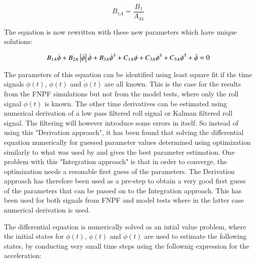             
    
    \begin{equation}
B_{1A} = \frac{B_{1}}{A_{44}}
\label{eq:equation}
\end{equation}

    

    The equation is now rewritten with these new parameters which have
unique solutions:
 
            
    
    \begin{equation}
B_{1A} \dot{\phi} \\ + B_{2A} \left|{\dot{\phi}}\right| \dot{\phi} \\ + B_{3A} \dot{\phi}^{3} \\ + C_{1A} \phi \\ + C_{3A} \phi^{3} \\ + C_{5A} \phi^{5} \\ + \ddot{\phi} = 0
\label{eq:equation}
\end{equation}

    

    The parameters of this equation can be identified using least square fit
if the time signals \(\phi(t)\), \(\dot{\phi}(t)\) and
\(\ddot{\phi}(t)\) are all known. This is the case for the results from
the FNPF simulations but not from the model tests, where only the roll
signal \(\phi(t)\) is known. The other time derivatives can be estimated
using numerical derivation of a low pass filtered roll signal or Kalman
filtered roll signal. The filtering will however introduce some errors
in itself. So instead of using this "Derivation approach", it has been
found that solving the differential equation numerically for guessed
parameter values determined using optimization similarly to what was
used by \cite{7505983/FJHQJJUH} and \cite{7505983/9B7QMVJJ} gives the
best parameter estimation. One problem with this "Integration approach"
is that in order to converge, the optimization needs a resonable first
guess of the parameters. The Derivation approach has therefore been used
as a pre-step to obtain a very good first guess of the parameters that
can be passed on to the Integration approach. This has been used for
both signals from FNPF and model tests where in the latter case
numerical derivation is used.

The differential equation is numerically solved as an intial value
problem, where the initial states for \(\phi(t)\), \(\dot{\phi}(t)\) and
\(\ddot{\phi}(t)\) are used to estimate the following states, by
conducting very small time steps using the follownig expression for the
acceleration:
 
